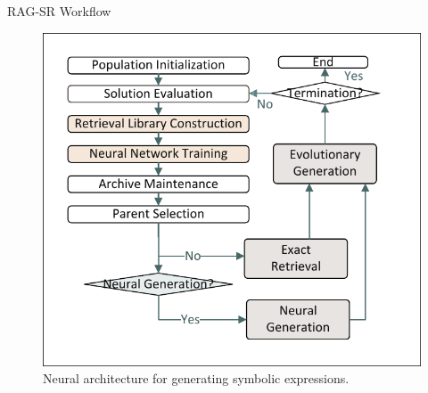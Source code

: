 \documentclass[final]{beamer}
\newlength{\onecolwid}
\begin{document}
\begin{frame}[t]
\begin{columns}[t]
\begin{column}{\onecolwid}
%



                \begin{block}{RAG-SR Workflow}
                    \begin{figure}
                        \centering
                        \includegraphics[width=0.75\linewidth, trim=10 15 10 15, clip]{figs/Flow.pdf}
                        \caption{Neural architecture for generating symbolic expressions.}
                    \end{figure}


\end{block}
\end{column}
\end{columns}
\end{frame}
\end{document}
